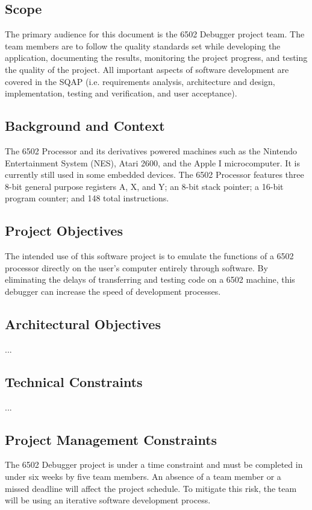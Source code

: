 \documentclass[a3paper, 11pt]{article}
\begin{document}
\subsection{Scope}
The primary audience for this document is the 6502 Debugger project team. The team members are to follow the quality standards set while developing the application, documenting the results, monitoring the project progress, and testing the quality of the project. All important aspects of software development are covered in the SQAP (i.e. requirements analysis, architecture and design, implementation, testing and verification, and user acceptance).

\subsection{Background and Context}
The 6502 Processor and its derivatives powered machines such as the Nintendo Entertainment System (NES), Atari 2600, and the Apple I microcomputer. It is currently still used in some embedded devices. The 6502 Processor features three 8-bit general purpose registers A, X, and Y; an 8-bit stack pointer; a 16-bit program counter; and 148 total instructions. 

\subsection{Project Objectives}
The intended use of this software project is to emulate the functions of a 6502 processor directly on the user’s computer entirely through software. By eliminating the delays of transferring and testing code on a 6502 machine, this debugger can increase the speed of development processes.

\subsection{Architectural Objectives}
...

\subsection{Technical Constraints}
...

\subsection{Project Management Constraints}
The 6502 Debugger project is under a time constraint and must be completed in under six weeks by five team members. An absence of a team member or a missed deadline will affect the project schedule. To mitigate this risk, the team will be using an iterative software development process.
\end{document}
